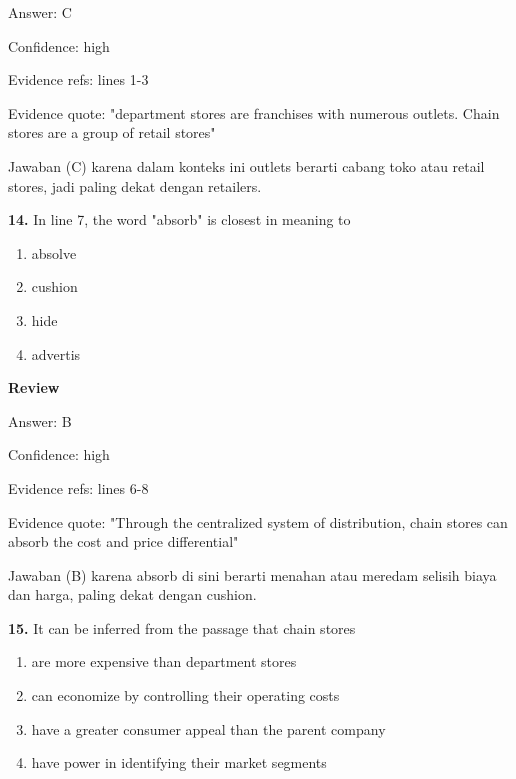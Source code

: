 \documentclass[12pt]{article}
\begin{document}
Answer: C\par
Confidence: high\par
Evidence refs: lines 1-3\par
Evidence quote: "department stores are franchises with numerous outlets. Chain stores are a group of retail stores"\par
Jawaban (C) karena dalam konteks ini outlets berarti cabang toko atau retail stores, jadi paling dekat dengan retailers.\par
\endgroup
\par
\vspace{0.25\baselineskip}
\noindent\textbf{14.} In line 7, the word "absorb" is closest in meaning to
\begin{enumerate}[label=(\Alph*),leftmargin=*,itemsep=0.2em]
\item absolve
\item cushion
\item hide
\item advertis
\end{enumerate}
\par
\begingroup
\setlength{\parskip}{0pt}
\setlength{\parindent}{0pt}
\textbf{Review}\par
Answer: B\par
Confidence: high\par
Evidence refs: lines 6-8\par
Evidence quote: "Through the centralized system of distribution, chain stores can absorb the cost and price differential"\par
Jawaban (B) karena absorb di sini berarti menahan atau meredam selisih biaya dan harga, paling dekat dengan cushion.\par
\endgroup
\par
\vspace{0.25\baselineskip}
\noindent\textbf{15.} It can be inferred from the passage that chain stores
\begin{enumerate}[label=(\Alph*),leftmargin=*,itemsep=0.2em]
\item are more expensive than department stores
\item can economize by controlling their operating costs
\item have a greater consumer appeal than the parent company
\item have power in identifying their market segments
\end{enumerate}
\par
\begingroup
\setlength{\parskip}{0pt}
\setlength{\parindent}{0pt}
\end{document}

